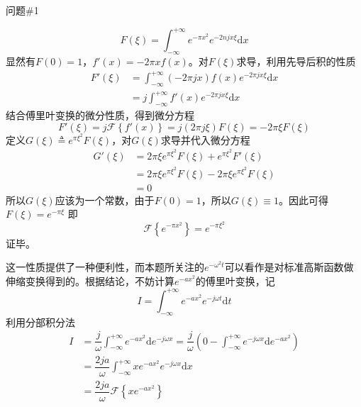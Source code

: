 \documentclass[12pt]{ctexart}
\begin{document}
    \begin{problem}{问题\#1}
        \begin{formal}
            $$
            F(\xi)=\int^{+\infty}_{-\infty}e^{-\pi x^2}e^{-2njx\xi}\text{d}x
            $$
            显然有$F(0)=1$，$f'(x)=-2\pi xf(x)$。对$F(\xi)$求导，利用先导后积的性质
            $$
            \begin{aligned}
                F'(\xi)&=\int^{+\infty}_{-\infty}(-2\pi jx)f(x)e^{-2\pi jx\xi}\text{d}x\\
                &=j\int^{+\infty}_{-\infty}f'(x)e^{-2\pi jx\xi}\text{d}x
            \end{aligned}
            $$
            结合傅里叶变换的微分性质，得到微分方程
            $$
            F'(\xi)=j\mathscr{F}\left\{f'(x)\right\}=j(2\pi j\xi)F(\xi)=-2\pi\xi F(\xi)
            $$
            定义$G(\xi)\triangleq e^{\pi\xi^2}F(\xi)$，对$G(\xi)$求导并代入微分方程
            $$
            \begin{aligned}
                G'(\xi)&=2\pi\xi e^{\pi\xi^2}F(\xi)+e^{\pi\xi^2}F'(\xi)\\
                &=2\pi\xi e^{\pi\xi^2}F(\xi)-2\pi\xi e^{\pi\xi^2}F(\xi)\\
                &=0
            \end{aligned}
            $$
            所以$G(\xi)$应该为一个常数，由于$F(0)=1$，所以$G(\xi)\equiv 1$。因此可得$F(\xi)=e^{-\pi\xi}$
            即
            $$
            \mathscr{F}\left\{e^{-\pi x^2}\right\}=e^{-\pi\xi^2}
            $$
            证毕。
        \end{formal}
        这一性质提供了一种便利性，而本题所关注的$e^{-\omega^2t}$可以看作是对标准高斯函数做伸缩变换得到的。根据结论，不妨计算$e^{-ax^2}$的傅里叶变换，记
        $$
        I=\int^{+\infty}_{-\infty}e^{-ax^2}e^{-j\omega t}\text{d}t
        $$
        利用分部积分法
        $$
        \begin{aligned}
            I&=\dfrac{j}{\omega}\int^{+\infty}_{-\infty}e^{-ax^2}\text{d}e^{-j\omega x}
            =\dfrac{j}{\omega}\left(0-\int^{+\infty}_{-\infty}e^{-j\omega x}\text{d}e^{-ax^2}\right)\\
            &=\dfrac{2ja}{\omega}\int^{+\infty}_{-\infty}xe^{-ax^2}e^{-j\omega x}\text{d}x\\
            &=\dfrac{2ja}{\omega}\mathscr{F}\left\{xe^{-ax^2}\right\}\\
        \end{aligned}
        $$
    \end{problem}
\end{document}

